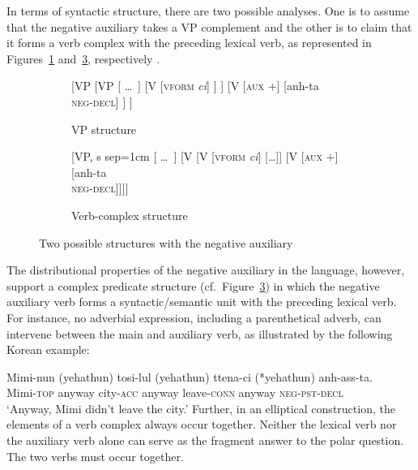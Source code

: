 \documentclass[output=paper
                ,modfonts
                		,nonflat
	        ,collection
	        ,collectionchapter
	        ,collectiontoclongg
 	        ,biblatex
                ,babelshorthands
                ,newtxmath
                ,draftmode
                ,colorlinks, citecolor=brown
]{./langsci/langscibook}
\begin{document}
{\begin{exe}
\begin{xlist}
\begin{exe}
\begin{xlist}
In terms of syntactic structure, there
are two possible analyses.  One is to assume that the negative auxiliary takes a VP complement and the other is to claim that it forms a verb complex with the preceding lexical verb, as represented in Figures~\ref{fig:3a} and~\ref{fig:3b}, respectively
\citep{Chung98a-u, Kim:16}.
%
\begin{figure}
	\begin{subfigure}[b]{0.48\textwidth}
\centering
		\begin{forest}
			[VP
				[VP
					[ \dots\ ]
					[V {[\textsc{vform} \textit{ci}]}
					]
					]
				[V {[\textsc{aux $+$}]}
					[anh-ta\\ \textsc{neg-decl}]
				]
			]	
		\end{forest}
	\caption{VP structure}\label{fig:3a}
		\end{subfigure}	
\hfill
	\begin{subfigure}[b]{0.48\textwidth}
\centering
		\begin{forest}
			[VP, s sep=1cm
				[ \dots\ ]
				[V
					[V {[\textsc{vform} \textit{ci}]}
						[\dots]]
					[V {[\textsc{aux $+$}]}
						[anh-ta\\ \textsc{neg-decl}]]]]
		\end{forest}
	\caption{Verb-complex structure}\label{fig:3b}	
		\end{subfigure}
	\caption{Two possible structures with the negative auxiliary}
\end{figure}

The distributional properties of the negative auxiliary in the language, however, support
 a complex predicate structure (cf.\ Figure~\ref{fig:3b}) in which the negative auxiliary verb
forms a syntactic/semantic unit with the preceding lexical verb.
For instance, no adverbial expression, including
a parenthetical adverb, can intervene between
the main and auxiliary verb, as illustrated by the
following Korean example:

\ea
\gll Mimi-nun (yehathun) tosi-lul (yehathun) ttena-ci (*yehathun) anh-ass-ta. \\
     Mimi-\textsc{top} anyway city-\textsc{acc} anyway leave-\textsc{conn} anyway \textsc{neg}-\textsc{pst}-\textsc{decl} \\
\glt `Anyway, Mimi didn't leave the city.'
\z
%
Further, in an elliptical construction, the elements of a verb complex
 always occur together. Neither the lexical  verb nor the auxiliary verb alone can serve
as the fragment answer to the polar question. The two verbs
must occur together.


\end{xlist}
\end{exe}
\end{xlist}
\end{exe}}
\end{document}
